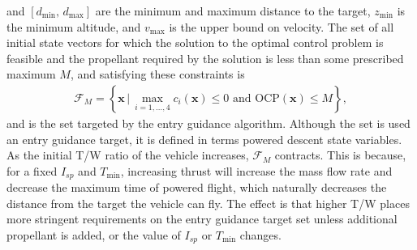 \documentclass[letterpaper, paper,11pt]{AAS}
\begin{document}
and $[d_{\min},\,d_{\max}]$ are the minimum and maximum distance to the target, $z_{\min}$ is the minimum altitude, and $v_{\max}$ is the upper bound on velocity. 
The set of all initial state vectors for which the solution to the optimal control problem is feasible and the propellant required by the solution is less than some prescribed maximum $ M $, and satisfying these constraints is 
\begin{align}
\mathcal{F}_{M} = \left\{\mathbf{x}\,|\, \max_{i={1,...,4}}c_i(\mathbf{x})\le 0\,\,\mathrm{and}\,\,\mathrm{OCP}(\mathbf{x}) \le M \right\},
\end{align}
and is the set targeted by the entry guidance algorithm. Although the set is used an entry guidance target, it is defined in terms powered descent state variables. As the initial T/W ratio of the vehicle increases, $\mathcal{F}_{M}$ contracts. This is because, for a fixed $I_{sp}$ and $T_{\min}$, increasing thrust will increase the mass flow rate and decrease the maximum time of powered flight, which naturally decreases the distance from the target the vehicle can fly. The effect is that higher T/W places more stringent requirements on the entry guidance target set unless additional propellant is added, or the value of $I_{sp}$ or $T_{\min}$ changes.
\end{document}
